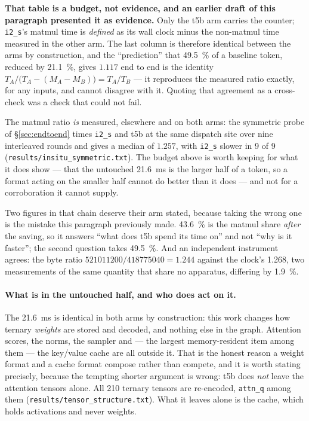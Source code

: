 \documentclass[11pt,a4paper]{article}
\newcommand{\code}[1]{\texttt{#1}}
\begin{document}
\textbf{That table is a budget, not evidence, and an earlier draft of this
paragraph presented it as evidence.} Only the t5b arm carries the counter;
\code{i2\_s}'s matmul time is \emph{defined} as its wall clock minus the
non-matmul time measured in the other arm. The last column is therefore
identical between the arms by construction, and the ``prediction'' that
\SI{49.5}{\percent} of a baseline token, reduced by \SI{21.1}{\percent},
gives $\num{1.117}$ end to end is the identity
$T_{A}/\bigl(T_{A}-(M_{A}-M_{B})\bigr)=T_{A}/T_{B}$ --- it reproduces the
measured ratio exactly, for any inputs, and cannot disagree with it. Quoting
that agreement as a cross-check was a check that could not fail.

The matmul ratio \emph{is} measured, elsewhere and on both arms: the symmetric
probe of \S\ref{sec:endtoend} times \code{i2\_s} and t5b at the same dispatch
site over nine interleaved rounds and gives a median of $\num{1.257}$, with
\code{i2\_s} slower in 9 of 9 (\code{results/insitu\_symmetric.txt}). The
budget above is worth keeping for what it does show --- that the untouched
\SI{21.6}{\milli\second} is the larger half of a token, so a format acting on
the smaller half cannot do better than it does --- and not for a corroboration
it cannot supply.

Two figures in that chain deserve their arm stated, because taking the wrong one
is the mistake this paragraph previously made. \SI{43.6}{\percent} is the matmul
share \emph{after} the saving, so it answers ``what does t5b spend its time on''
and not ``why is it faster''; the second question takes \SI{49.5}{\percent}. And
an independent instrument agrees: the byte ratio
$\num{521011200}/\num{418775040}=\num{1.244}$ against the clock's \num{1.268},
two measurements of the same quantity that share no apparatus, differing by
\SI{1.9}{\percent}.

\paragraph{What is in the untouched half, and who does act on it.} The
\SI{21.6}{\milli\second} is identical in both arms by construction: this work
changes how ternary \emph{weights} are stored and decoded, and nothing else in
the graph. Attention scores, the norms, the sampler and --- the largest
memory-resident item among them --- the key/value cache are all outside it. That
is the honest reason a weight format and a cache format compose rather than
compete, and it is worth stating precisely, because the tempting shorter
argument is wrong: t5b does \emph{not} leave the attention tensors alone. All
\num{210} ternary tensors are re-encoded, \code{attn\_q} among them
(\code{results/tensor\_structure.txt}). What it leaves alone is the cache, which
holds activations and never weights.
\end{document}
